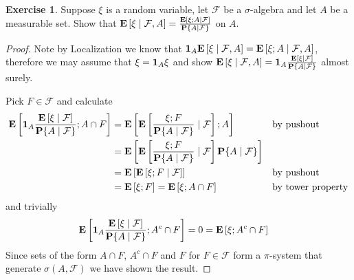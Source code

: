 \documentclass{amsart}
\theoremstyle{remark}
\theoremstyle{definition}
\newtheorem{ex}[thm]{Exercise}
\begin{document}
\begin{ex}Suppose $\xi$ is a random variable, let $\mathcal{F}$ be
  a $\sigma$-algebra and let $A$ be a measurable set.  Show that
  $\cexpectationlong{\mathcal{F},A}{\xi} =
  \frac{\cexpectationlong{\mathcal{F}}{\xi ;
      A}}{\cprobability{\mathcal{F}}{A}}$ on $A$.
\end{ex}
\begin{proof}
Note by Localization we know that $\characteristic{A}
\cexpectationlong{\mathcal{F},A}{\xi}  =
\cexpectationlong{\mathcal{F},A}{\xi;A}$, therefore we may assume that
$\xi = \characteristic{A} \xi$ and show
$\cexpectationlong{\mathcal{F},A}{\xi} = \characteristic{A}\frac{\cexpectationlong{\mathcal{F}}{\xi}}{\cprobability{\mathcal{F}}{A}}$ almost surely.

Pick $F \in \mathcal{F}$ and calculate
\begin{align*}
\expectation{\characteristic{A} \frac{\cexpectationlong{\mathcal{F}}
{\xi}}
{\cprobability{\mathcal{F}}{A}}
; A \cap F} 
&= \expectation{\cexpectationlong{\mathcal{F}}{\frac{\xi ; F}
{\cprobability{\mathcal{F}}{A}}} 
; A } & & \text{by pushout}\\
&= \expectation{\cexpectationlong{\mathcal{F}}{\frac{\xi ; F}
{\cprobability{\mathcal{F}}{A}}} 
\cprobability{\mathcal{F}}{A} } \\
&= \expectation{\cexpectationlong{\mathcal{F}}{\xi ; F}} & & \text{by
  pushout} \\
&= \expectation{\xi ; F} = 
\expectation{\xi ; A \cap F} & & \text{by tower property}
\end{align*}
and trivially
\begin{align*}
\expectation{\characteristic{A} \frac{\cexpectationlong{\mathcal{F}}
{\xi}}
{\cprobability{\mathcal{F}}{A}}
; A^c \cap F}  &= 0 = \expectation{\xi ; A^c \cap F}
\end{align*}
Since sets of the form $A \cap F$, $A^c \cap F$ and $F$ for $F \in
\mathcal{F}$ form a $\pi$-system that generate $\sigma(A,
\mathcal{F})$ we have shown the result.
\end{proof}
\end{document}
